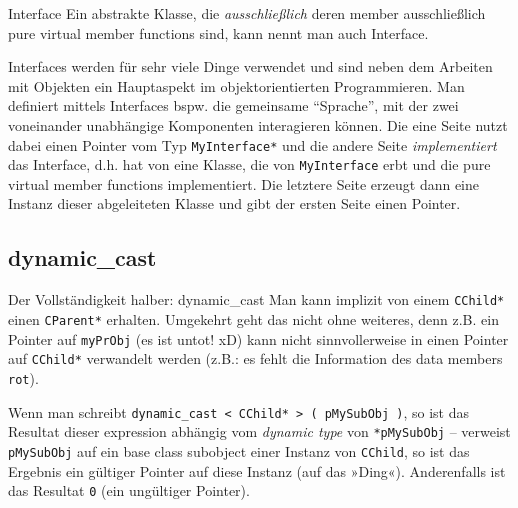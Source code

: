 \begin{frame}[fragile]{Interface}
	Ein abstrakte Klasse, die \emph{ausschließlich} deren member ausschließlich pure virtual member functions sind, kann nennt man auch Interface.
	
	\pause
	\vspace{1em}
	
	Interfaces werden für sehr viele Dinge verwendet und sind neben dem Arbeiten mit Objekten ein Hauptaspekt im objektorientierten Programmieren. Man definiert mittels Interfaces bspw. die gemeinsame \enquote{Sprache}, mit der zwei voneinander unabhängige Komponenten interagieren können. Die eine Seite nutzt dabei einen Pointer vom Typ \verb|MyInterface*| und die andere Seite \emph{implementiert} das Interface, d.h. hat von eine Klasse, die von \verb|MyInterface| erbt und die pure virtual member functions implementiert. Die letztere Seite erzeugt dann eine Instanz dieser abgeleiteten Klasse und gibt der ersten Seite einen Pointer.
\end{frame}


\subsection{dynamic\_cast}

\begin{frame}[fragile]{Der Vollständigkeit halber: dynamic\_cast}
	Man kann implizit von einem \verb|CChild*| einen \verb|CParent*| erhalten. Umgekehrt geht das nicht ohne weiteres, denn z.B. ein Pointer auf \verb|myPrObj| (es ist untot! xD) kann nicht sinnvollerweise in einen Pointer auf \verb|CChild*| verwandelt werden (z.B.: es fehlt die Information des data members \verb|rot|).
	
	\pause
	\vspace{1em}
	
	Wenn man schreibt \verb|dynamic_cast < CChild* > ( pMySubObj )|, so ist das Resultat dieser expression abhängig vom \emph{dynamic type} von \verb|*pMySubObj| -- verweist \verb|pMySubObj| auf ein base class subobject einer Instanz von \verb|CChild|, so ist das Ergebnis ein gültiger Pointer auf diese Instanz (auf das »Ding«). Anderenfalls ist das Resultat \verb|0| (ein ungültiger Pointer).
\end{frame}
